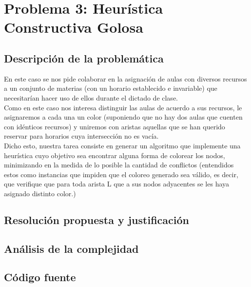 \section{Problema 3: Heurística Constructiva Golosa}

\subsection{Descripción de la problemática}
En este caso se nos pide colaborar en la asignación de aulas con diversos recursos a un conjunto de materias (con un horario establecido e invariable) que necesitarían hacer uso de ellos durante el dictado de clase.\\
Como en este caso nos interesa distinguir las aulas de acuerdo a sus recursos, le asignaremos a cada una un color (suponiendo que no hay dos aulas que cuenten con idénticos recursos) y uniremos con aristas aquellas que se han querido reservar para horarios cuya intersección no es vacía.\\
Dicho esto, nuestra tarea consiste en generar un algoritmo que implemente una heurística cuyo objetivo sea encontrar alguna forma de colorear los nodos, minimizando en la medida de lo posible la cantidad de conflictos (entendidos estos como instancias que impiden que el coloreo generado sea válido, es decir, que verifique que para toda arista L que a sus nodos adyacentes se les haya asignado distinto color.) 


\subsection{Resolución propuesta y justificación}

\subsection{Análisis de la complejidad}


\subsection{Código fuente}
% 
% 

